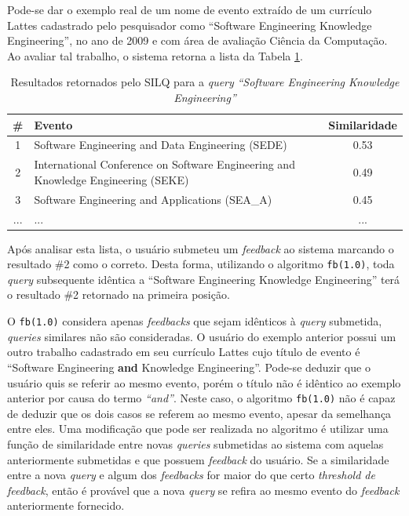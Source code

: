 \documentclass[12pt]{article}
\newcommand{\quotes}[1]{``#1''}
\begin{document}
Pode-se dar o exemplo real de um nome de evento extraído de um currículo Lattes cadastrado pelo pesquisador como \quotes{Software Engineering Knowledge Engineering}, no ano de 2009 e com área de avaliação Ciência da Computação. Ao avaliar tal trabalho, o sistema retorna a lista da Tabela \ref{tab:exemplo-fb1}.

\begin{table}[!h]
\begin{center}
\caption{Resultados retornados pelo SILQ para a \textit{query} \textit{\quotes{Software Engineering Knowledge Engineering}}} \label{tab:exemplo-fb1}
\begin{tabular}{ c | p{7cm} | c }
\hline
\textbf{\#} & \textbf{Evento} & \textbf{Similaridade} \\ \hline
1 & Software Engineering and Data Engineering (SEDE) & 0.53 \\ \hline
2 & International Conference on Software Engineering and Knowledge Engineering (SEKE) & 0.49 \\ \hline
3 & Software Engineering and Applications (SEA\_A) & 0.45 \\ \hline
... & ... & ... \\
\hline
\end{tabular}
\end{center}
\end{table}

Após analisar esta lista, o usuário submeteu um \textit{feedback} ao sistema marcando o resultado \#2 como o correto. Desta forma, utilizando o algoritmo \texttt{fb(1.0)}, toda \textit{query} subsequente idêntica a \quotes{Software Engineering Knowledge Engineering} terá o resultado \#2 retornado na primeira posição.

O \texttt{fb(1.0)} considera apenas \textit{feedbacks} que sejam idênticos à \textit{query} submetida, \textit{queries} similares não são consideradas. O usuário do exemplo anterior possui um outro trabalho cadastrado em seu currículo Lattes cujo título de evento é \quotes{Software Engineering \textbf{and} Knowledge Engineering}. Pode-se deduzir que o usuário quis se referir ao mesmo evento, porém o título não é idêntico ao exemplo anterior por causa do termo \textit{\quotes{and}}. Neste caso, o algoritmo \texttt{fb(1.0)} não é capaz de deduzir que os dois casos se referem ao mesmo evento, apesar da semelhança entre eles. Uma modificação que pode ser realizada no algoritmo é utilizar uma função de similaridade entre novas \textit{queries} submetidas ao sistema com aquelas anteriormente submetidas e que possuem \textit{feedback} do usuário. Se a similaridade entre a nova \textit{query} e algum dos \textit{feedbacks} for maior do que certo \textit{threshold de feedback}, então é provável que a nova \textit{query} se refira ao mesmo evento do \textit{feedback} anteriormente fornecido.
\end{document}
